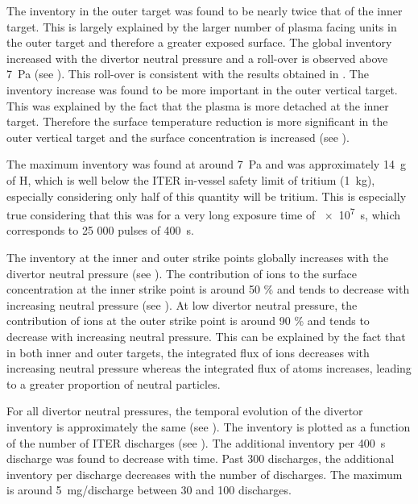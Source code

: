 The inventory in the outer target was found to be nearly twice that of the inner target.
This is largely explained by the larger number of plasma facing units in the outer target and therefore a greater exposed surface.
The global inventory increased with the divertor neutral pressure and a roll-over is observed above \SI{7}{Pa} (see ).
This roll-over is consistent with the results obtained in .
The inventory increase was found to be more important in the outer vertical target.
This was explained by the fact that the plasma is more detached at the inner target.
Therefore the surface temperature reduction is more significant in the outer vertical target and the surface concentration is increased (see ).

The maximum inventory was found at around \SI{7}{Pa} and was approximately \SI{14}{g} of H, which is well below the ITER in-vessel safety limit of tritium (\SI{1}{kg}), especially considering only half of this quantity will be tritium.
This is especially true considering that this was for a very long exposure time of \SI{e7}{s}, which corresponds to 25 000 pulses of \SI{400}{s}.


The inventory at the inner and outer strike points globally increases with the divertor neutral pressure (see ).
The contribution of ions to the surface concentration at the inner strike point is around 50 \% and tends to decrease with increasing neutral pressure (see ).
At low divertor neutral pressure, the contribution of ions at the outer strike point is around 90 \% and tends to decrease with increasing neutral pressure.
This can be explained by the fact that in both inner and outer targets, the integrated flux of ions decreases with increasing neutral pressure whereas the integrated flux of atoms increases, leading to a greater proportion of neutral particles.

For all divertor neutral pressures, the temporal evolution of the divertor inventory is approximately the same (see ).
The inventory is plotted as a function of the number of ITER discharges (see ).
The additional inventory per \SI{400}{s} discharge was found to decrease with time.
Past 300 discharges, the additional inventory per discharge decreases with the number of discharges.
The maximum is around \SI{5}{mg/discharge} between 30 and 100 discharges.


